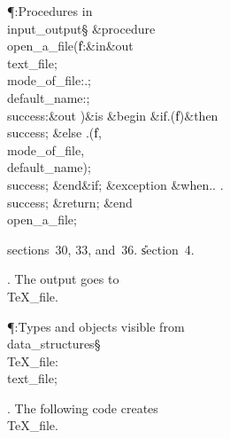 \Y\P\?\4:Procedures in \\{input\_output}\X\S\?\6
\&{procedure}\8\1\\{open\_a\_file}\?(\?\|f\?:\&{in}\?\8\&{out}\8\\{text\_file};%
\?\,\?\\{mode\_of\_file}\?:\?\?.\?;\?\,\?%
\\{default\_name}\?:\?;\?\,\1\?\\{success}\?:\?\&{out}\8%
\?\2)\?\2\8\&{is}\8\1\6
\4\&{begin}\6
\&{if}\1\1\8\?.\?\?\1(\?\|f\?\2)\?\2\8\&{then}\6
\\{success}\?\K\?;\6
\4\&{else}\6
\?.\?\?\1(\?\?\KR\?\|f\?,\?\?\KR\?%
\\{mode\_of\_file}\?,\?\?\KR\?\\{default\_name}\?\2)\?;\5
\\{success}\?\K\?;\2\6
\&{end}\8\2\&{if}\1;\6
\1\4\&{exception}\6
\4\&{when}\8\?.\?\?\mathrel{\.|}\?\?.%
\?\?\mathrel{\.|}\?\?.\?\KR\6
\\{success}\?\K\?;\5
\&{return};\5
\hbox{\2}\2\6
\&{end}\8\\{open\_a\_file};\par
\A sections~30, 33, and~36.
\U section~4\*.\fi

. The output goes to \\{TeX\_file}.

\Y\P\?\4:Types and objects visible from \\{data\_structures}\X\mathrel{+}\S%
\?\6
\\{TeX\_file}\?:\?\\{text\_file};\par
\fi

. The following code creates \\{TeX\_file}.

